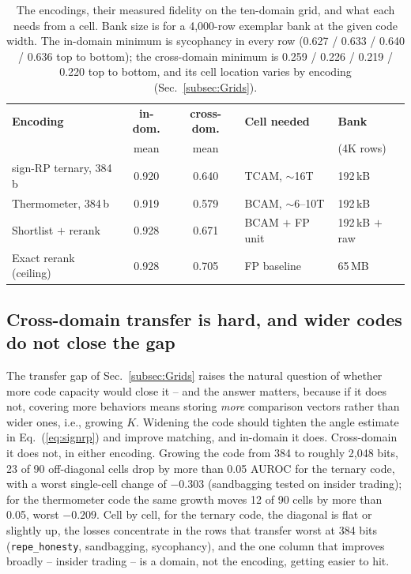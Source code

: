 \documentclass[conference]{IEEEtran}
\newcommand{\tcam}{{TCAM}\xspace}
\newcommand{\auroc}{{AUROC}\xspace}
\newcommand{\signrp}{{sign-RP}\xspace}
\begin{document}
\begin{table}[t]
\centering
\caption{The encodings, their measured fidelity on the ten-domain grid,
and what each needs from a cell. Bank size is for a 4{,}000-row exemplar
bank at the given code width. The in-domain minimum is sycophancy in
every row (0.627 / 0.633 / 0.640 / 0.636 top to bottom); the
cross-domain minimum is 0.259 / 0.226 / 0.219 / 0.220 top to bottom,
and its cell location varies by encoding
(Sec.~\ref{subsec:Grids}).}
\label{tab:encodings}
{\scriptsize\setlength{\tabcolsep}{3.5pt}
\begin{tabular}{@{}lccll@{}}
\toprule
\textbf{Encoding} & \textbf{in-dom.} & \textbf{cross-dom.} &
\textbf{Cell needed} & \textbf{Bank} \\
 & mean & mean & & (4K rows) \\
\midrule
\signrp ternary, 384\,b       & 0.920 & 0.640 & \tcam, $\sim$16T   & 192\,kB \\
Thermometer, 384\,b           & 0.919 & 0.579 & BCAM, $\sim$6--10T & 192\,kB \\
Shortlist $+$ rerank          & 0.928 & 0.671 & BCAM $+$ FP unit   & 192\,kB $+$ raw \\
Exact rerank (ceiling)        & 0.928 & 0.705 & FP baseline        & 65\,MB \\
\bottomrule
\end{tabular}}
\end{table}

\subsection{Cross-domain transfer is hard, and wider codes do not
close the gap}
\label{subsec:BitWidth}

The transfer gap of Sec.~\ref{subsec:Grids} raises the natural
question of whether more code capacity would close it -- and the
answer matters, because if it does not, covering more behaviors means
storing \emph{more} comparison vectors rather than wider ones, i.e.,
growing $K$. Widening the code should tighten the angle estimate in
Eq.~(\ref{eq:signrp}) and improve matching, and in-domain it does.
Cross-domain it does not, in either encoding. Growing the code from 384
to roughly 2{,}048 bits, 23 of 90 off-diagonal cells drop by more than
0.05 \auroc for the ternary code, with a worst single-cell change of
$-0.303$ (sandbagging tested on insider trading); for the thermometer
code the same growth moves 12 of 90 cells by more than 0.05, worst
$-0.209$. Cell by cell, for the ternary code, the diagonal is flat or
slightly up, the losses concentrate in the rows that transfer worst at 384 bits
(\texttt{repe\_honesty}, sandbagging, sycophancy), and the one column
that improves broadly -- insider trading -- is a domain, not the
encoding, getting easier to hit.
\end{document}
